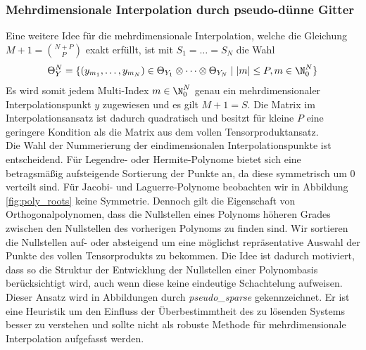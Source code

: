 \subsubsection*{Mehrdimensionale Interpolation durch pseudo-dünne Gitter}
Eine weitere Idee für die mehrdimensionale Interpolation, welche die Gleichung $M+1=\binom{N+P}{P}$ exakt erfüllt, ist mit $S_1=\dots=S_N$ die Wahl
\[\Theta_Y^N=\lbrace (y_{m_1},\dots,y_{m_N})\in \Theta_{Y_1}\otimes \dots \otimes \Theta_{Y_N} \mid |m|\le P,m\in\N_0^N \rbrace \]
Es wird somit jedem Multi-Index $m\in\N_0^N$ genau ein mehrdimensionaler Interpolationspunkt $y$ zugewiesen und es gilt $M+1=S$. Die Matrix im Interpolationsansatz ist dadurch quadratisch und besitzt für kleine $P$ eine geringere Kondition als die Matrix aus dem vollen Tensorproduktansatz.\\[0.1cm]
Die Wahl der Nummerierung der eindimensionalen Interpolationspunkte ist entscheidend. Für Legendre- oder Hermite-Polynome bietet sich eine betragsmäßig aufsteigende Sortierung der Punkte an, da diese symmetrisch um $0$ verteilt sind. Für Jacobi- und Laguerre-Polynome beobachten wir in Abbildung \ref{fig:poly_roots} keine Symmetrie. Dennoch gilt die Eigenschaft von Orthogonalpolynomen, dass die Nullstellen eines Polynoms höheren Grades zwischen den Nullstellen des vorherigen Polynoms zu finden sind. Wir sortieren die Nullstellen auf- oder absteigend um eine möglichst repräsentative Auswahl der Punkte des vollen Tensorprodukts zu bekommen. Die Idee ist dadurch motiviert, dass so die Struktur der Entwicklung der Nullstellen einer Polynombasis berücksichtigt wird, auch wenn diese keine eindeutige Schachtelung aufweisen.\\
Dieser Ansatz wird in Abbildungen durch \textit{pseudo\_sparse} gekennzeichnet. Er ist eine Heuristik um den Einfluss der Überbestimmtheit des zu lösenden Systems besser zu verstehen und sollte nicht als robuste Methode für mehrdimensionale Interpolation aufgefasst werden.\\
